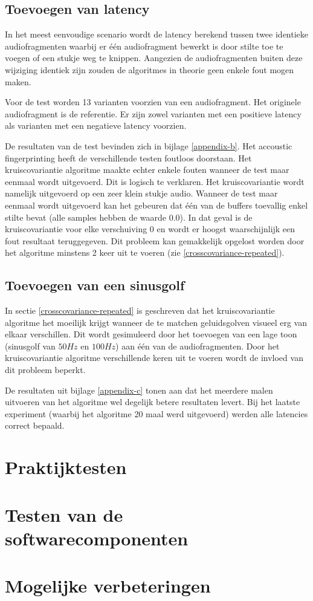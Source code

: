 \subsection{Toevoegen van latency}

In het meest eenvoudige scenario wordt de latency berekend tussen twee identieke audiofragmenten waarbij er één audiofragment bewerkt is door stilte toe te voegen of een stukje weg te knippen. Aangezien de audiofragmenten buiten deze wijziging identiek zijn zouden de algoritmes in theorie geen enkele fout mogen maken.

Voor de test worden 13 varianten voorzien van een audiofragment. Het originele audiofragment is de referentie. Er zijn zowel varianten met een positieve latency als varianten met een negatieve latency voorzien.

De resultaten van de test bevinden zich in bijlage \ref{appendix-b}. Het accoustic fingerprinting heeft de verschillende testen foutloos doorstaan. Het kruiscovariantie algoritme maakte echter enkele fouten wanneer de test maar eenmaal wordt uitgevoerd. Dit is logisch te verklaren. Het kruiscovariantie wordt namelijk uitgevoerd op een zeer klein stukje audio. Wanneer de test maar eenmaal wordt uitgevoerd kan het gebeuren dat één van de buffers toevallig enkel stilte bevat (alle samples hebben de waarde 0.0). In dat geval is de kruiscovariantie voor elke verschuiving 0 en wordt er hoogst waarschijnlijk een fout resultaat teruggegeven. Dit probleem kan gemakkelijk opgelost worden door het algoritme minstens 2 keer uit te voeren (zie \ref{crosscovariance-repeated}).

\subsection{Toevoegen van een sinusgolf}

In sectie \ref{crosscovariance-repeated} is geschreven dat het kruiscovariantie algoritme het moeilijk krijgt wanneer de te matchen geluidsgolven visueel erg van elkaar verschillen. Dit wordt gesimuleerd door het toevoegen van een lage toon (sinusgolf van $50Hz$ en $100Hz$) aan één van de audiofragmenten. Door het kruiscovariantie algoritme verschillende keren uit te voeren wordt de invloed van dit probleem beperkt.

De resultaten uit bijlage \ref{appendix-c} tonen aan dat het meerdere malen uitvoeren van het algoritme wel degelijk betere resultaten levert. Bij het laatste experiment (waarbij het algoritme 20 maal werd uitgevoerd) werden alle latencies correct bepaald.

\section{Praktijktesten}

\section{Testen van de softwarecomponenten}



\section{Mogelijke verbeteringen}

